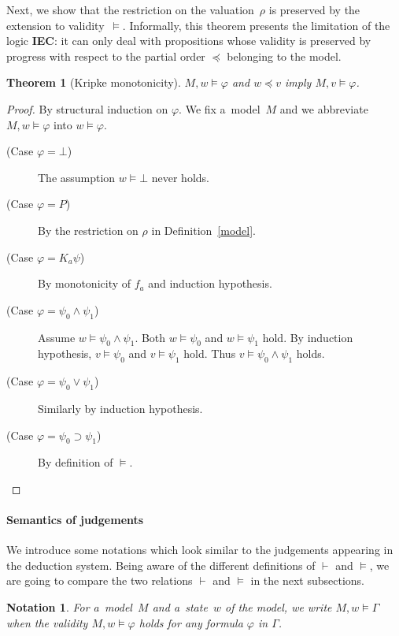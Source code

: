 \documentclass[doctor]{iscs-thesis}
\newcommand{\iec}{{\rm {\textbf{IEC}}}}
\newtheorem{notation}{Notation}
\newtheorem{theorem}{Theorem}
\begin{document}
Next, we show that the restriction on the valuation~$\rho$ is preserved by the extension
to validity~$\models$. Informally, this theorem presents the limitation of the logic \iec:
it can only deal with propositions whose validity is preserved by progress with respect to
the partial order $\preceq$ belonging to the model.
\begin{theorem}[Kripke monotonicity]
\label{kripke}
$M,w\models \varphi$ and $w\preceq v$ imply
$M,v\models \varphi$.
\end{theorem}
\begin{proof}
 By structural induction on $\varphi$.
 We fix a~model~$M$ and we abbreviate $M,w \models
 \varphi$ into $w\models \varphi$.
\begin{description}
 \item[(Case $\varphi = \bot$)]  The assumption $w\models \bot$ never holds.
 \item[(Case $\varphi = P$)] By the restriction on $\rho$ in Definition~\ref{model}.
 \item[(Case $\varphi = K_a \psi$)] 
	    By monotonicity of $f_a$ and induction hypothesis.
 \item[(Case $\varphi = \psi_0\wedge\psi_1$)] 
	    Assume $w\models \psi_0\wedge \psi_1$.
	    Both $w\models \psi_0$ and $w\models \psi_1$ hold. 
	    By induction hypothesis, $v\models\psi_0$ and
	    $v\models\psi_1$ hold.
	    Thus
	    $v\models \psi_0\wedge \psi_1$ holds.
 \item[(Case $\varphi = \psi_0\vee\psi_1$)] 
	    Similarly by induction hypothesis.
 \item[(Case $\varphi =\psi_0\supset\psi_1$)]
	    By definition of $\models$.
\end{description}
\end{proof}

\paragraph{Semantics of judgements}

We introduce some notations which look similar to the judgements appearing in the 
deduction
system.
Being aware of the different definitions of $\vdash$ and $\models$, we are going to
compare the two relations $\vdash$ and $\models$ in the next subsections.

\begin{notation}
For a~model~$M$ and a~state~$w$ of the model,
we write $M,w\models \Gamma$ when the validity
$M,w\models\varphi$ holds for any formula $\varphi$ in $\Gamma$.
\end{notation}
\end{document}
